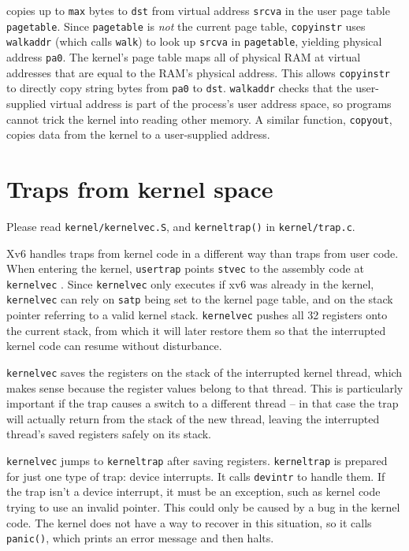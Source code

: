  copies up to \lstinline{max} bytes to
\lstinline{dst} from virtual address \lstinline{srcva} in the user page
table \lstinline{pagetable}.
Since \lstinline{pagetable} is {\it not} the current page
table,
\lstinline{copyinstr} uses {\tt walkaddr}
(which calls {\tt walk}) to look up
\lstinline{srcva} in
\lstinline{pagetable}, yielding
physical address \lstinline{pa0}.
The kernel's page table maps all of physical RAM 
at virtual addresses that are equal to the RAM's physical address.
This allows
{\tt copyinstr} to directly copy string bytes from {\tt pa0} to {\tt dst}.
{\tt walkaddr} 
checks that the user-supplied virtual address is part of
the process's user address space, so programs
cannot trick the kernel into reading other memory.
A similar function, {\tt copyout}, copies data from the
kernel to a user-supplied address.

\section{Traps from kernel space}
\label{s:ktraps}

Please read {\tt kernel/kernelvec.S},
and {\tt kerneltrap()} in {\tt kernel/trap.c}.

Xv6 handles traps from kernel code in a different way
than traps from user code.
When entering the kernel, {\tt usertrap} points {\tt stvec}
to the assembly code at {\tt kernelvec}
.
Since {\tt kernelvec} only executes if
xv6 was already in the kernel, {\tt kernelvec} can rely
on {\tt satp} being set to the kernel page table, and on the
stack pointer referring to a valid kernel stack.
{\tt kernelvec} pushes all 32 registers onto the current stack,
from which it will later restore them
so that the interrupted
kernel code can resume without disturbance.

{\tt kernelvec} saves the registers on the stack of the interrupted
kernel thread, which makes sense because the register values belong to
that thread. This is particularly important if the trap causes a
switch to a different thread -- in that case the trap will actually
return from the stack of the new thread, leaving the interrupted
thread's saved registers safely on its stack.

{\tt kernelvec} jumps to {\tt kerneltrap}
 after saving registers.
{\tt kerneltrap} is prepared for just one type of trap:
device interrupts. It calls
{\tt devintr}
to handle them.
If the trap isn't a device interrupt, it must be an exception,
such as kernel code trying to use an invalid pointer.
This could only be caused by a bug in the kernel code.
The kernel does not have a way to recover in this situation,
so it calls {\tt panic()}, which prints an error message
and then halts.

